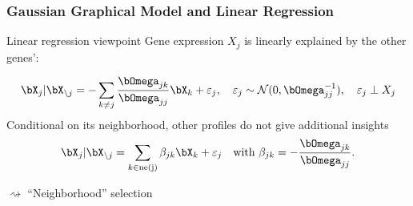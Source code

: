 \begin{frame}
  \frametitle{Gaussian Graphical Model and Linear Regression}

  \begin{block}{Linear regression viewpoint}
    Gene expression $X_j$ is linearly explained by the other genes':

    \begin{equation*}
      \bX_j | \bX_{ \setminus j} = - \sum_{k \neq j}
      \frac{\invcov_{jk}}{\invcov_{jj}} \bX_{k} + \varepsilon_j,\quad \varepsilon_j
      \sim \mathcal{N}(0,\invcov_{jj}^{-1}), \quad \varepsilon_j \perp X_j
      \end{equation*}
      Conditional  on its  neighborhood,  other profiles  do not  give additional insights
    \begin{equation*}
      \bX_j | \bX_{ \setminus j} =
       \sum_{k \in \text{ne(j)}} \beta_{jk} \bX_k + \varepsilon_j
      \quad         \text{with         }         \beta_{jk}         =
      -\frac{\invcov_{jk}}{\invcov_{jj}}.
    \end{equation*}
  \end{block}


  \vfill
  \alert{$\rightsquigarrow$ ``Neighborhood'' selection}

\end{frame}

